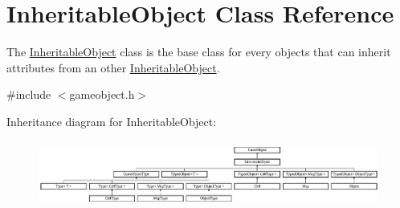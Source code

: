 \hypertarget{class_inheritable_object}{\section{\-Inheritable\-Object \-Class \-Reference}
\label{class_inheritable_object}
}


\-The \hyperlink{class_inheritable_object}{\-Inheritable\-Object} class is the base class for every objects that can inherit attributes from an other \hyperlink{class_inheritable_object}{\-Inheritable\-Object}.  




{\ttfamily \#include $<$gameobject.\-h$>$}

\-Inheritance diagram for \-Inheritable\-Object\-:\begin{figure}[H]
\begin{center}
\leavevmode
\includegraphics[height=2.209945cm]{class_inheritable_object}
\end{center}
\end{figure}

